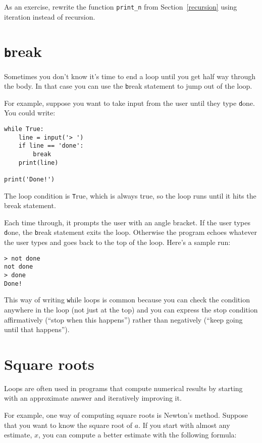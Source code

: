 \documentclass[
DIV=11,
fontsize=12,
twoside,
headinclude=false,
titlepage=firstiscover,
abstract=true,
headsepline=true,
footsepline=true,
chapterprefix=true, %
headings=big,
bibliography=totoc,%
captions=tableheading
]{scrbook}
\theoremstyle{definition}
\begin{document}
As an exercise, rewrite the function \verb"print_n" from
Section~\ref{recursion} using iteration instead of recursion.


\section{{\texttt break}}

Sometimes you don't know it's time to end a loop until you get half
way through the body.  In that case you can use the {\texttt break}
statement to jump out of the loop.

For example, suppose you want to take input from the user until they
type {\texttt done}.  You could write:

\begin{lstlisting}
while True:
    line = input('> ')
    if line == 'done':
        break
    print(line)

print('Done!')
\end{lstlisting}
%
The loop condition is {\texttt True}, which is always true, so the
loop runs until it hits the break statement.

Each time through, it prompts the user with an angle bracket.
If the user types {\texttt done}, the {\texttt break} statement exits
the loop.  Otherwise the program echoes whatever the user types
and goes back to the top of the loop.  Here's a sample run:

\begin{lstlisting}
> not done
not done
> done
Done!
\end{lstlisting}
%
This way of writing {\texttt while} loops is common because you
can check the condition anywhere in the loop (not just at the
top) and you can express the stop condition affirmatively
(``stop when this happens'') rather than negatively (``keep going
until that happens'').


\section{Square roots}
\label{squareroot}

Loops are often used in programs that compute
numerical results by starting with an approximate answer and
iteratively improving it.

For example, one way of computing square roots is Newton's method.
Suppose that you want to know the square root of $a$.  If you start
with almost any estimate, $x$, you can compute a better
estimate with the following formula:
\end{document}
